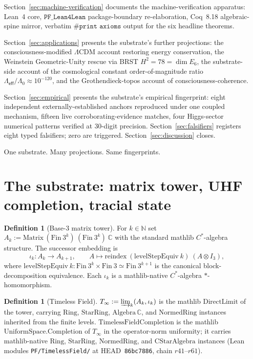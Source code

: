 \documentclass[11pt,a4paper]{amsart}
\theoremstyle{plain}
\theoremstyle{definition}
\newtheorem{definition}[theorem]{Definition}
\newcommand{\Tinf}{T_{\infty}}
\begin{document}
Section~\ref{sec:machine-verification} documents the machine-verification apparatus: Lean~4 core, $\texttt{PF\_Lean4Lean}$ package-boundary re-elaboration, Coq~8.18 algebraic-spine mirror, verbatim $\texttt{\#print axioms}$ output for the six headline theorems.

Section~\ref{sec:applications} presents the substrate's further projections: the consciousness-modified $\Lambda$CDM account restoring energy conservation, the Weinstein Geometric-Unity rescue via BRST $H^{2} = 78 = \dim E_{6}$, the substrate-side account of the cosmological constant order-of-magnitude ratio $\Lambda_{\textsf{eff}}/\Lambda_{0} \approx 10^{-120}$, and the Grothendieck-topos account of consciousness-coherence.

Section~\ref{sec:empirical} presents the substrate's empirical fingerprint: eight independent externally-established anchors reproduced under one coupled mechanism, fifteen live corroborating-evidence matches, four Higgs-sector numerical patterns verified at $30$-digit precision. Section~\ref{sec:falsifiers} registers eight typed falsifiers; zero are triggered. Section~\ref{sec:discussion} closes.

One substrate. Many projections. Same fingerprints.

\section{The substrate: matrix tower, UHF completion, tracial state}\label{sec:cstar-and-trace}

\begin{definition}[Base-3 matrix tower]\label{def:matrix-tower}
For $k \in \mathbb{N}$ set $A_{k} := \mathrm{Matrix}~(\mathrm{Fin}~3^{k})~(\mathrm{Fin}~3^{k})~\mathbb{C}$ with the standard mathlib $C^*$-algebra structure. The successor embedding is
\[
\iota_{k} \colon A_{k} \to A_{k+1}, \qquad A \longmapsto \mathrm{reindex}~(\mathrm{levelStepEquiv}~k)~(A \otimes I_{3}),
\]
where $\mathrm{levelStepEquiv}~k \colon \mathrm{Fin}~3^{k} \times \mathrm{Fin}~3 \simeq \mathrm{Fin}~3^{k+1}$ is the canonical block-decomposition equivalence. Each $\iota_{k}$ is a mathlib-native $C^*$-algebra $*$-homomorphism.
\end{definition}

\begin{definition}[Timeless Field]\label{def:timeless-field}
$\Tinf := \varinjlim_{k}(A_{k}, \iota_{k})$ is the mathlib $\mathrm{DirectLimit}$ of the tower, carrying $\mathrm{Ring}$, $\mathrm{StarRing}$, $\mathrm{Algebra}\,\mathbb{C}$, and $\mathrm{NormedRing}$ instances inherited from the finite levels. $\mathrm{TimelessFieldCompletion}$ is the mathlib $\mathrm{UniformSpace.Completion}$ of $\Tinf$ in the operator-norm uniformity; it carries mathlib-native $\mathrm{Ring}$, $\mathrm{StarRing}$, $\mathrm{NormedRing}$, and $\mathrm{CStarAlgebra}$ instances (Lean modules \texttt{PF/TimelessField/} at HEAD~\texttt{86bc7886}, chain $r41$--$r61$).
\end{definition}
\end{document}

